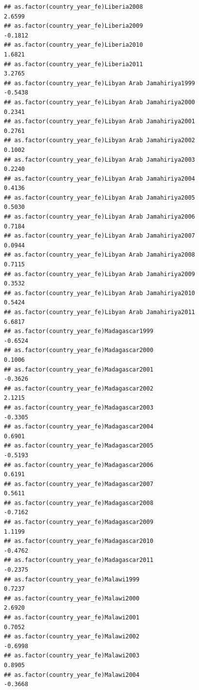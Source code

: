 \documentclass[
  a4paper,
]{article}
\begin{document}
\begin{verbatim}
## as.factor(country_year_fe)Liberia2008                           2.6599
## as.factor(country_year_fe)Liberia2009                          -0.1812
## as.factor(country_year_fe)Liberia2010                           1.6821
## as.factor(country_year_fe)Liberia2011                           3.2765
## as.factor(country_year_fe)Libyan Arab Jamahiriya1999           -0.5438
## as.factor(country_year_fe)Libyan Arab Jamahiriya2000            0.2341
## as.factor(country_year_fe)Libyan Arab Jamahiriya2001            0.2761
## as.factor(country_year_fe)Libyan Arab Jamahiriya2002            0.1002
## as.factor(country_year_fe)Libyan Arab Jamahiriya2003            0.2240
## as.factor(country_year_fe)Libyan Arab Jamahiriya2004            0.4136
## as.factor(country_year_fe)Libyan Arab Jamahiriya2005            0.5030
## as.factor(country_year_fe)Libyan Arab Jamahiriya2006            0.7184
## as.factor(country_year_fe)Libyan Arab Jamahiriya2007            0.0944
## as.factor(country_year_fe)Libyan Arab Jamahiriya2008            0.7115
## as.factor(country_year_fe)Libyan Arab Jamahiriya2009            0.3532
## as.factor(country_year_fe)Libyan Arab Jamahiriya2010            0.5424
## as.factor(country_year_fe)Libyan Arab Jamahiriya2011            6.6817
## as.factor(country_year_fe)Madagascar1999                       -0.6524
## as.factor(country_year_fe)Madagascar2000                        0.1006
## as.factor(country_year_fe)Madagascar2001                       -0.3626
## as.factor(country_year_fe)Madagascar2002                        2.1215
## as.factor(country_year_fe)Madagascar2003                       -0.3305
## as.factor(country_year_fe)Madagascar2004                        0.6901
## as.factor(country_year_fe)Madagascar2005                       -0.5193
## as.factor(country_year_fe)Madagascar2006                        0.6191
## as.factor(country_year_fe)Madagascar2007                        0.5611
## as.factor(country_year_fe)Madagascar2008                       -0.7162
## as.factor(country_year_fe)Madagascar2009                        1.1199
## as.factor(country_year_fe)Madagascar2010                       -0.4762
## as.factor(country_year_fe)Madagascar2011                       -0.2375
## as.factor(country_year_fe)Malawi1999                            0.7237
## as.factor(country_year_fe)Malawi2000                            2.6920
## as.factor(country_year_fe)Malawi2001                            0.7052
## as.factor(country_year_fe)Malawi2002                           -0.6998
## as.factor(country_year_fe)Malawi2003                            0.8905
## as.factor(country_year_fe)Malawi2004                           -0.3668

\end{verbatim}
\end{document}
